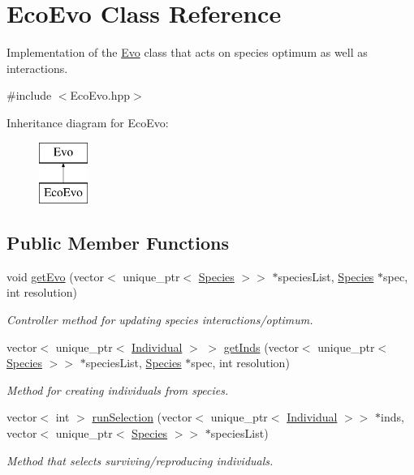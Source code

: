 \hypertarget{classEcoEvo}{}\section{Eco\+Evo Class Reference}
\label{classEcoEvo}


Implementation of the \hyperlink{classEvo}{Evo} class that acts on species optimum as well as interactions.  




{\ttfamily \#include $<$Eco\+Evo.\+hpp$>$}

Inheritance diagram for Eco\+Evo\+:\begin{figure}[H]
\begin{center}
\leavevmode
\includegraphics[height=2.000000cm]{classEcoEvo}
\end{center}
\end{figure}
\subsection*{Public Member Functions}
\begin{DoxyCompactItemize}
\item 
void \hyperlink{classEcoEvo_a93564a6d93cdc1802182273c353e0552}{get\+Evo} (vector$<$ unique\+\_\+ptr$<$ \hyperlink{classSpecies}{Species} $>$$>$ $\ast$species\+List, \hyperlink{classSpecies}{Species} $\ast$spec, int resolution)
\begin{DoxyCompactList}\small\item\em Controller method for updating species interactions/optimum. \end{DoxyCompactList}\item 
vector$<$ unique\+\_\+ptr$<$ \hyperlink{classIndividual}{Individual} $>$ $>$ \hyperlink{classEcoEvo_a819363c533784efea949ebc70a6d4636}{get\+Inds} (vector$<$ unique\+\_\+ptr$<$ \hyperlink{classSpecies}{Species} $>$$>$ $\ast$species\+List, \hyperlink{classSpecies}{Species} $\ast$spec, int resolution)
\begin{DoxyCompactList}\small\item\em Method for creating individuals from species. \end{DoxyCompactList}\item 
vector$<$ int $>$ \hyperlink{classEcoEvo_adfd00eb377489649a279e567abc3ae94}{run\+Selection} (vector$<$ unique\+\_\+ptr$<$ \hyperlink{classIndividual}{Individual} $>$$>$ $\ast$inds, vector$<$ unique\+\_\+ptr$<$ \hyperlink{classSpecies}{Species} $>$$>$ $\ast$species\+List)
\begin{DoxyCompactList}\small\item\em Method that selects surviving/reproducing individuals. \end{DoxyCompactList}\end{DoxyCompactItemize}
